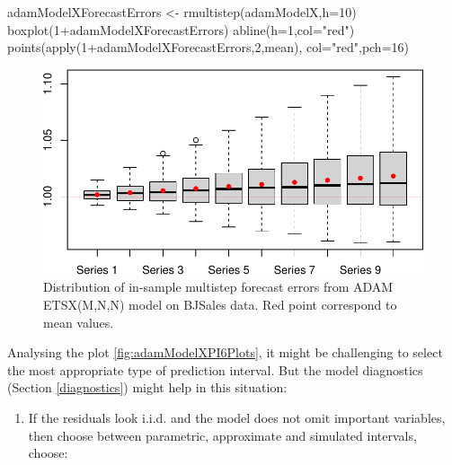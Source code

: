 \documentclass[
]{book}
\newenvironment{Shaded}{\begin{snugshade}}{\end{snugshade}}
\newcommand{\AttributeTok}[1]{\textcolor[rgb]{0.77,0.63,0.00}{#1}}
\newcommand{\DecValTok}[1]{\textcolor[rgb]{0.00,0.00,0.81}{#1}}
\newcommand{\FunctionTok}[1]{\textcolor[rgb]{0.00,0.00,0.00}{#1}}
\newcommand{\NormalTok}[1]{#1}
\newcommand{\OtherTok}[1]{\textcolor[rgb]{0.56,0.35,0.01}{#1}}
\newcommand{\SpecialCharTok}[1]{\textcolor[rgb]{0.00,0.00,0.00}{#1}}
\newcommand{\StringTok}[1]{\textcolor[rgb]{0.31,0.60,0.02}{#1}}
\providecommand{\tightlist}{%
  \setlength{\itemsep}{0pt}\setlength{\parskip}{0pt}}
\theoremstyle{definition}
\theoremstyle{definition}
\theoremstyle{definition}
\theoremstyle{definition}
\theoremstyle{remark}
\begin{document}
\begin{Shaded}
\begin{Highlighting}[]
\NormalTok{adamModelXForecastErrors }\OtherTok{\textless{}{-}} \FunctionTok{rmultistep}\NormalTok{(adamModelX,}\AttributeTok{h=}\DecValTok{10}\NormalTok{)}
\FunctionTok{boxplot}\NormalTok{(}\DecValTok{1}\SpecialCharTok{+}\NormalTok{adamModelXForecastErrors)}
\FunctionTok{abline}\NormalTok{(}\AttributeTok{h=}\DecValTok{1}\NormalTok{,}\AttributeTok{col=}\StringTok{"red"}\NormalTok{)}
\FunctionTok{points}\NormalTok{(}\FunctionTok{apply}\NormalTok{(}\DecValTok{1}\SpecialCharTok{+}\NormalTok{adamModelXForecastErrors,}\DecValTok{2}\NormalTok{,mean),}
       \AttributeTok{col=}\StringTok{"red"}\NormalTok{,}\AttributeTok{pch=}\DecValTok{16}\NormalTok{)}
\end{Highlighting}
\end{Shaded}

\begin{figure}
\centering
\includegraphics{Svetunkov--2022----ADAM_files/figure-latex/adamModelXForecastErrors-1.pdf}
\caption{\label{fig:adamModelXForecastErrors}Distribution of in-sample multistep forecast errors from ADAM ETSX(M,N,N) model on BJSales data. Red point correspond to mean values.}
\end{figure}

Analysing the plot \ref{fig:adamModelXPI6Plots}, it might be challenging to select the most appropriate type of prediction interval. But the model diagnostics (Section \ref{diagnostics}) might help in this situation:

\begin{enumerate}
\def\labelenumi{\arabic{enumi}.}
\tightlist
\item
  If the residuals look i.i.d. and the model does not omit important variables, then choose between parametric, approximate and simulated intervals, choose:
\end{enumerate}
\end{document}
